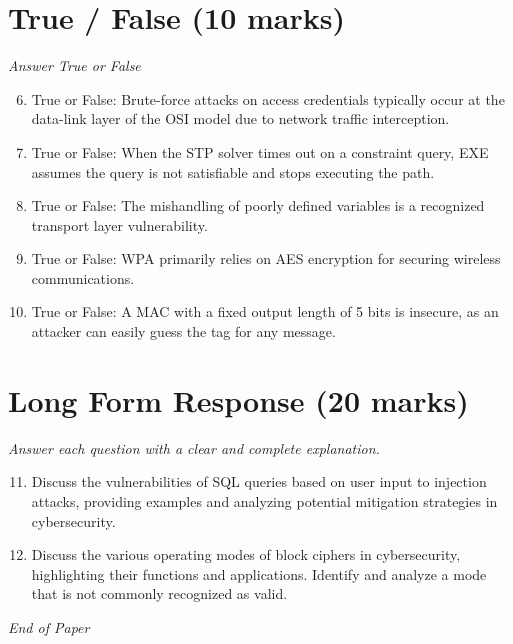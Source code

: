 \documentclass[12pt]{article}
\begin{document}
\section*{True / False (10 marks)}
\textit{Answer True or False}
\begin{enumerate}[label=\arabic*.]
\setcounter{enumi}{5}
\item True or False: Brute-force attacks on access credentials typically occur at the data-link layer of the OSI model due to network traffic interception.
\item True or False: When the STP solver times out on a constraint query, EXE assumes the query is not satisfiable and stops executing the path.
\item True or False: The mishandling of poorly defined variables is a recognized transport layer vulnerability.
\item True or False: WPA primarily relies on AES encryption for securing wireless communications.
\item True or False: A MAC with a fixed output length of 5 bits is insecure, as an attacker can easily guess the tag for any message.
\end{enumerate}

\section*{Long Form Response (20 marks)}
\textit{Answer each question with a clear and complete explanation.}
\begin{enumerate}[label=\arabic*.]
\setcounter{enumi}{10}
\item Discuss the vulnerabilities of SQL queries based on user input to injection attacks, providing examples and analyzing potential mitigation strategies in cybersecurity.
\item Discuss the various operating modes of block ciphers in cybersecurity, highlighting their functions and applications. Identify and analyze a mode that is not commonly recognized as valid.
\end{enumerate}

\vfill
\noindent\textit{End of Paper}
\end{document}
